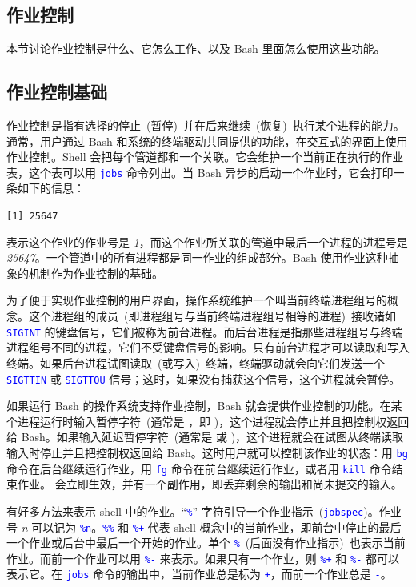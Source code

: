 \documentclass[openany,notitlepage]{book}
\newcommand{\codeblock}[1]{\begin{center}\begin{minipage}{.7\textwidth}{\tt #1}\end{minipage}\end{center}}
\newcommand{\code}[1]{\textcolor{blue}{{\tt #1}}}
\newcommand{\hl}[1]{{\sl #1}}
\begin{document}
\begin{CJK}{UTF8}{song}
\chapter{作业控制}\label{job-control} %
本节讨论作业控制是什么、它怎么工作、以及 Bash 里面怎么使用这些功能。

\section{作业控制基础}\label{job-control-basic} %
作业控制是指有选择的停止~(暂停)~并在后来继续~(恢复)~执行某个进程的能力。通常，用户通过 Bash 和系统的终端驱动共同提供的功能，在交互式的界面上使用作业控制。Shell 会把每个管道都和一个关联。它会维护一个当前正在执行的作业表，这个表可以用 \code{jobs} 命令列出。当 Bash 异步的启动一个作业时，它会打印一条如下的信息：
    \codeblock{[1] 25647}
表示这个作业的作业号是 \hl{1}，而这个作业所关联的管道中最后一个进程的进程号是 \hl{25647}。一个管道中的所有进程都是同一作业的组成部分。Bash 使用作业这种抽象的机制作为作业控制的基础。

为了便于实现作业控制的用户界面，操作系统维护一个叫当前终端进程组号的概念。这个进程组的成员~(即进程组号与当前终端进程组号相等的进程)~接收诸如 \code{SIGINT} 的键盘信号，它们被称为前台进程。而后台进程是指那些进程组号与终端进程组号不同的进程，它们不受键盘信号的影响。只有前台进程才可以读取和写入终端。如果后台进程试图读取~(或写入)~终端，终端驱动就会向它们发送一个 \code{SIGTTIN} 或 \code{SIGTTOU} 信号；这时，如果没有捕获这个信号，这个进程就会暂停。

如果运行 Bash 的操作系统支持作业控制，Bash 就会提供作业控制的功能。在某个进程运行时输入暂停字符~(通常是 ，即 )，这个进程就会停止并且把控制权返回给 Bash。如果输入延迟暂停字符~(通常是  或 )，这个进程就会在试图从终端读取输入时停止并且把控制权返回给 Bash。这时用户就可以控制该作业的状态：用 \code{bg} 命令在后台继续运行作业，用 \code{fg} 命令在前台继续运行作业，或者用 \code{kill} 命令结束作业。 会立即生效，并有一个副作用，即丢弃剩余的输出和尚未提交的输入。

有好多方法来表示 shell 中的作业。``\code{\%}'' 字符引导一个作业指示~(\code{jobspec})。作业号 \hl{n} 可以记为 \code{\%n}。\code{\%\%} 和 \code{\%+} 代表 shell 概念中的当前作业，即前台中停止的最后一个作业或后台中最后一个开始的作业。单个 \code{\%}~(后面没有作业指示)~也表示当前作业。而前一个作业可以用 \code{\%-} 来表示。如果只有一个作业，则 \code{\%+} 和 \code{\%-} 都可以表示它。在 \code{jobs} 命令的输出中，当前作业总是标为 \code{+}，而前一个作业总是 \code{-}。


\end{CJK}
\end{document}
